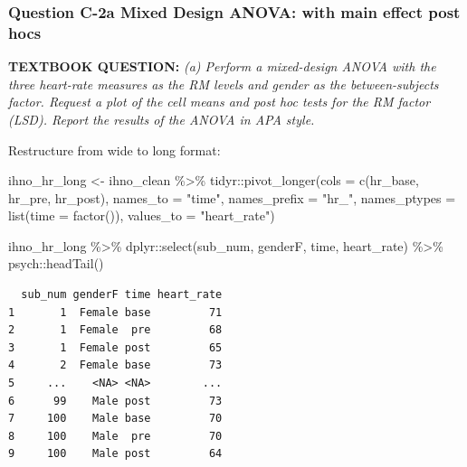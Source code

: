\documentclass[
]{article}
\newenvironment{Shaded}{\begin{snugshade}}{\end{snugshade}}
\newcommand{\AttributeTok}[1]{\textcolor[rgb]{0.77,0.63,0.00}{#1}}
\newcommand{\FunctionTok}[1]{\textcolor[rgb]{0.00,0.00,0.00}{#1}}
\newcommand{\NormalTok}[1]{#1}
\newcommand{\OtherTok}[1]{\textcolor[rgb]{0.56,0.35,0.01}{#1}}
\newcommand{\SpecialCharTok}[1]{\textcolor[rgb]{0.00,0.00,0.00}{#1}}
\newcommand{\StringTok}[1]{\textcolor[rgb]{0.31,0.60,0.02}{#1}}
\begin{document}
\hypertarget{question-c-2a-mixed-design-anova-with-main-effect-post-hocs}{%
\subsubsection{Question C-2a Mixed Design ANOVA: with main effect post
hocs}\label{question-c-2a-mixed-design-anova-with-main-effect-post-hocs}}

\textbf{TEXTBOOK QUESTION:} \emph{(a) Perform a mixed-design ANOVA with
the three heart-rate measures as the RM levels and gender as the
between-subjects factor. Request a plot of the cell means and post hoc
tests for the RM factor (LSD). Report the results of the ANOVA in APA
style.}

Restructure from wide to long format:

\begin{Shaded}
\begin{Highlighting}[]
\NormalTok{ihno\_hr\_long }\OtherTok{\textless{}{-}}\NormalTok{ ihno\_clean }\SpecialCharTok{\%\textgreater{}\%} 
\NormalTok{  tidyr}\SpecialCharTok{::}\FunctionTok{pivot\_longer}\NormalTok{(}\AttributeTok{cols =} \FunctionTok{c}\NormalTok{(hr\_base, hr\_pre, hr\_post),}
                      \AttributeTok{names\_to =} \StringTok{"time"}\NormalTok{,}
                      \AttributeTok{names\_prefix =} \StringTok{"hr\_"}\NormalTok{,}
                      \AttributeTok{names\_ptypes =} \FunctionTok{list}\NormalTok{(}\AttributeTok{time =} \FunctionTok{factor}\NormalTok{()),}
                      \AttributeTok{values\_to =} \StringTok{"heart\_rate"}\NormalTok{)}
\end{Highlighting}
\end{Shaded}

\begin{Shaded}
\begin{Highlighting}[]
\NormalTok{ihno\_hr\_long }\SpecialCharTok{\%\textgreater{}\%} 
\NormalTok{  dplyr}\SpecialCharTok{::}\FunctionTok{select}\NormalTok{(sub\_num, genderF, time, heart\_rate) }\SpecialCharTok{\%\textgreater{}\%} 
\NormalTok{  psych}\SpecialCharTok{::}\FunctionTok{headTail}\NormalTok{()}
\end{Highlighting}
\end{Shaded}

\begin{verbatim}
  sub_num genderF time heart_rate
1       1  Female base         71
2       1  Female  pre         68
3       1  Female post         65
4       2  Female base         73
5     ...    <NA> <NA>        ...
6      99    Male post         73
7     100    Male base         70
8     100    Male  pre         70
9     100    Male post         64
\end{verbatim}
\end{document}
